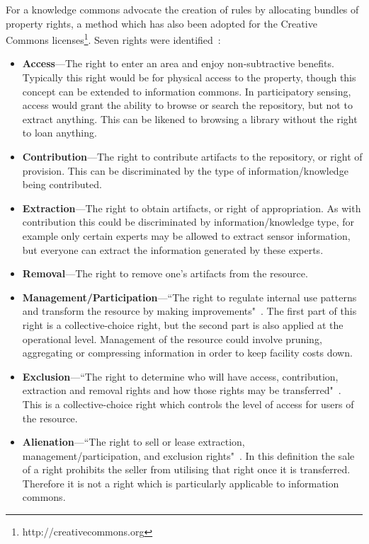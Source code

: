 For a knowledge commons  advocate the creation of rules by allocating bundles of property rights, a method which has also been adopted for the Creative Commons licenses\footnote{http://creativecommons.org}. 
Seven rights were identified~\citep{Schlager1992}:
\begin{itemize}
\item \textbf{Access}---The right to enter an area and enjoy non-subtractive benefits. Typically this right would be for physical access to the property, though this concept can be extended to information commons. 
In participatory sensing, access would grant the ability to browse or search the repository, but not to extract anything. This can be likened to browsing a library without the right to loan anything. 
\item \textbf{Contribution}---The right to contribute artifacts to the repository, or right of provision. This can be discriminated by the type of information/knowledge being contributed. 
\item \textbf{Extraction}---The right to obtain artifacts, or right of appropriation. 
As with contribution this could be discriminated by information/knowledge type, for example only certain experts may be allowed to extract sensor information, but everyone can extract the information generated by these experts.
\item \textbf{Removal}---The right to remove one's artifacts from the resource.
\item \textbf{Management/Participation}---``The right to regulate internal use patterns and transform the resource by making improvements"~\cite[p.52]{Ostrom2007a}. 
The first part of this right is a collective-choice right, but the second part is also applied at the operational level. 
Management of the resource could involve pruning, aggregating or compressing information in order to keep facility costs down.
\item \textbf{Exclusion}---``The right to determine who will have access, contribution, extraction and removal rights and how those rights may be transferred"~\cite[p.53]{Ostrom2007a}. 
This is a collective-choice right which controls the level of access for users of the resource. 
\item \textbf{Alienation}---``The right to sell or lease extraction, management/participation, and exclusion rights"~\cite[p.53]{Ostrom2007a}. In this definition the sale of a right prohibits the seller from utilising that right once it is transferred. Therefore it is not a right which is particularly applicable to information commons.
\end{itemize}

